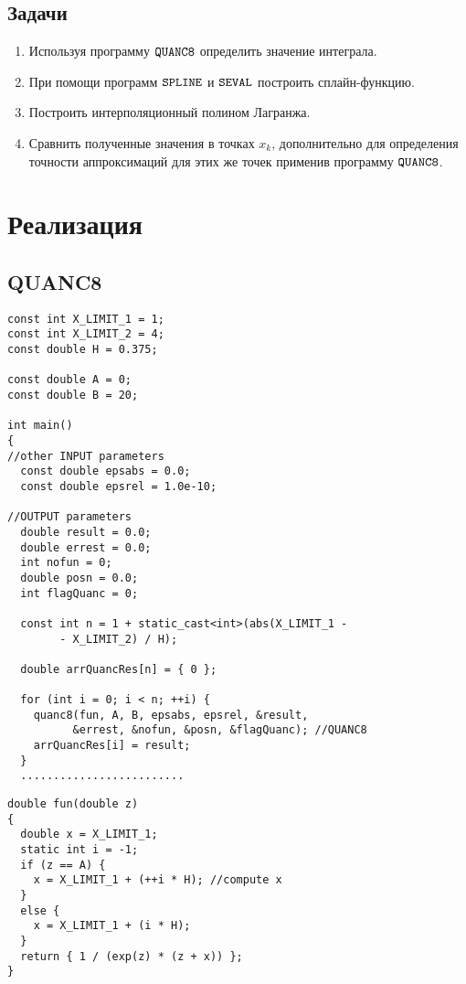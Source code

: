 \documentclass[a4paper,11pt]{article}
\begin{document}
\subsection{Задачи}
\begin{enumerate}
  \item Используя программу $\verb|QUANC8|$ определить значение интеграла.
  \item При помощи программ $\verb|SPLINE|$ и $\verb|SEVAL|$ построить сплайн-функцию.
  \item Построить интерполяционный полином Лагранжа.
  \item Сравнить полученные значения в точках $x_k$,
        дополнительно для определения точности аппроксимаций для этих же точек применив программу $\verb|QUANC8|$.
\end{enumerate}

\newpage
\section{Реализация}
\subsection{QUANC8}

\begin{lstlisting}[label=quanc8,caption=QUANC8]
const int X_LIMIT_1 = 1;
const int X_LIMIT_2 = 4;
const double H = 0.375;

const double A = 0;
const double B = 20;

int main()
{
//other INPUT parameters
  const double epsabs = 0.0;
  const double epsrel = 1.0e-10;

//OUTPUT parameters
  double result = 0.0;
  double errest = 0.0;
  int nofun = 0;
  double posn = 0.0;
  int flagQuanc = 0;

  const int n = 1 + static_cast<int>(abs(X_LIMIT_1 -
        - X_LIMIT_2) / H);

  double arrQuancRes[n] = { 0 };

  for (int i = 0; i < n; ++i) {
    quanc8(fun, A, B, epsabs, epsrel, &result,
          &errest, &nofun, &posn, &flagQuanc); //QUANC8
    arrQuancRes[i] = result;
  }
  .........................
\end{lstlisting}

\begin{lstlisting}[label=fun,caption=Подынтегральная функция]
double fun(double z)
{
  double x = X_LIMIT_1;
  static int i = -1;
  if (z == A) {
    x = X_LIMIT_1 + (++i * H); //compute x
  }
  else {
    x = X_LIMIT_1 + (i * H);
  }
  return { 1 / (exp(z) * (z + x)) };
}
\end{lstlisting}
\end{document}
